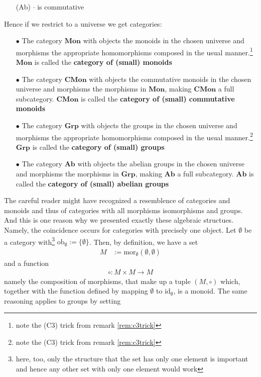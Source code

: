 \begin{exa}
\begin{enumerate}
\item[(Ab)]
$\cdot$ is commutative
\end{enumerate}
Hence if we restrict to a universe we get categories:
\begin{enumerate}
\item[$\bullet$]
The category $\mathbf{Mon}$ with objects the monoids in the chosen universe and morphisms the appropriate homomorphisms composed in the usual manner.\footnote{note the (C3) trick from remark \ref{rem:c3trick}} $\mathbf{Mon}$ is called the \textbf{category of (small) monoids}
\item[$\bullet$]
The category $\mathbf{CMon}$ with objects the commutative monoids in the chosen universe and morphisms the morphisms in $\mathbf{Mon}$, making $\mathbf{CMon}$ a full subcategory. $\mathbf{CMon}$ is called the \textbf{category of (small) commutative monoids}
\item[$\bullet$]
The category $\mathbf{Grp}$ with objects the groups in the chosen universe and morphisms the appropriate homomorphisms composed in the usual manner.\footnote{note the (C3) trick from remark \ref{rem:c3trick}} $\mathbf{Grp}$ is called the \textbf{category of (small) groups}
\item[$\bullet$]
The category $\mathbf{Ab}$ with objects the abelian groups in the chosen universe and morphisms the morphisms in $\mathbf{Grp}$, making $\mathbf{Ab}$ a full subcategory. $\mathbf{Ab}$ is called the \textbf{category of (small) abelian groups}
\end{enumerate}
The careful reader might have recognized a resemblence of categories and monoids and thus of categories with all morphisms isomorphisms and groups. And this is one reason why we presented exactly these algebraic structues. Namely, the coincidence occurs for categories with precisely one object. Let $\pmb{\emptyset}$ be a category with\footnote{here, too, only the structure that the set has only one element is important and hence any other set with only one element would work} $\mathrm{ob}_{\pmb{\emptyset}} := \lbrace \emptyset \rbrace$. Then, by definition, we have a set
\begin{align*}
  M
  &:=
  \mathrm{mor}_{\pmb{\emptyset}}(\emptyset,\emptyset)
\end{align*}
and a function
\begin{align*}
  \circ
  \colon
  M
  \times
  M
  \rightarrow
  M
\end{align*}
namely the composition of morphisms, that make up a tuple $(M,\circ)$ which, together with the function defined by mapping $\emptyset$ to $\mathrm{id}_{\emptyset}$, is a monoid. The same reasoning applies to groups by setting

\end{exa}
